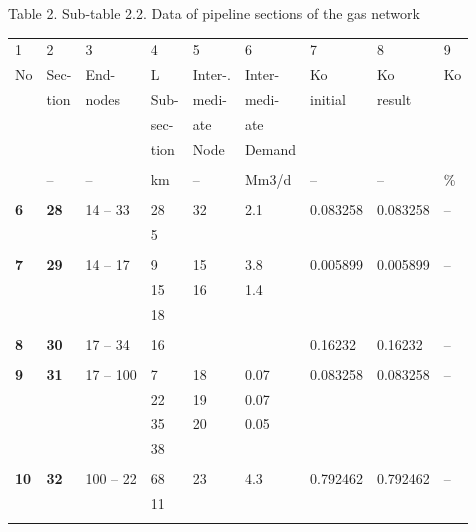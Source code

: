 \documentclass{article}
\begin{document}
\bigskip

\newpage

\bigskip

Table 2. Sub-table 2.2. Data of pipeline sections of the gas network

\bigskip

\begin{tabular}{lllllllll}
1 & 2 & 3 & 4 & 5 & 6 & 7 & 8 & 9 \\ 
No & Sec- & End- & L & Inter-. & Inter- & Ko & Ko & Ko \\ 
& tion & nodes & Sub- & medi- & medi- & initial & result &  \\ 
&  &  & sec- & ate & ate &  &  &  \\ 
&  &  & tion & Node & Demand &  &  &  \\ 
&  &  &  &  &  &  &  &  \\ 
& -- & -- & km & -- & Mm3/d & -- & -- & \% \\ 
&  &  &  &  &  &  &  &  \\ 
\textbf{6} & \textbf{28} & 14 -- 33 & 28 & 32 & 2.1 & 0.083258 & 0.083258 & 
-- \\ 
&  &  & 5 &  &  &  &  &  \\ 
&  &  &  &  &  &  &  &  \\ 
\textbf{7} & \textbf{29} & 14 -- 17 & 9 & 15 & 3.8 & 0.005899 & 0.005899 & --
\\ 
&  &  & 15 & 16 & 1.4 &  &  &  \\ 
&  &  & 18 &  &  &  &  &  \\ 
&  &  &  &  &  &  &  &  \\ 
\textbf{8} & \textbf{30} & 17 -- 34 & 16 &  &  & 0.16232 & 0.16232 & -- \\ 
&  &  &  &  &  &  &  &  \\ 
\textbf{9} & \textbf{31} & 17 -- 100 & 7 & 18 & 0.07 & 0.083258 & 0.083258 & 
-- \\ 
&  &  & 22 & 19 & 0.07 &  &  &  \\ 
&  &  & 35 & 20 & 0.05 &  &  &  \\ 
&  &  & 38 &  &  &  &  &  \\ 
&  &  &  &  &  &  &  &  \\ 
\textbf{10} & \textbf{32} & 100 -- 22 & 68 & 23 & 4.3 & 0.792462 & 0.792462
& -- \\ 
&  &  & 11 &  &  &  &  &  \\ 
&  &  &  &  &  &  &  & 
\end{tabular}

\bigskip
\end{document}

